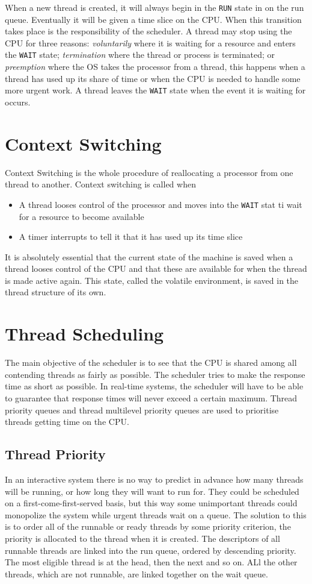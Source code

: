 When a new thread is created, it will always begin in the \verb|RUN| state in on the run queue. Eventually it will be given a time slice on the CPU. When this transition takes place is the responsibility of the scheduler. A thread may stop using the CPU for three reasons: \textit{voluntarily} where it is waiting for a resource and enters the \verb|WAIT| state; \textit{termination} where the thread or process is terminated; or \textit{preemption} where the OS takes the processor from a thread, this happens when a thread has used up its share of time or when the CPU is needed to handle some more urgent work. A thread leaves the \verb|WAIT| state when the event it is waiting for occurs. 

\section{Context Switching}
Context Switching is the whole procedure of reallocating a processor from one thread to another. Context switching is called when
\begin{itemize}
    \item A thread looses control of the processor and moves into the \verb|WAIT| stat ti wait for a resource to become available
    \item A timer interrupts to tell it that it has used up its time slice
\end{itemize}
It is absolutely essential that the current state of the machine is saved when a thread looses control of the CPU and that these are available for when the thread is made active again. This state, called the volatile environment, is saved in the thread structure of its own. 

\section{Thread Scheduling}
The main objective of the scheduler is to see that the CPU is shared among all contending threads as fairly as possible. The scheduler tries to make the response time as short as possible. In real-time systems, the scheduler will have to be able to guarantee that response times will never exceed a certain maximum. Thread priority queues and thread multilevel priority queues are used to prioritise threads getting time on the CPU.

\subsection{Thread Priority}
In an interactive system there is no way to predict in advance how many threads will be running, or how long they will want to run for. They could be scheduled on a first-come-first-served basis, but this way some unimportant threads could monopolize the system while urgent threads wait on a queue. The solution to this is to order all of the runnable or ready threads by some priority criterion, the priority is allocated to the thread when it is created. The descriptors of all runnable threads are linked into the run queue, ordered by descending priority. The most eligible thread is at the head, then the next and so on. ALl the other threads, which are not runnable, are linked together on the wait queue. 

